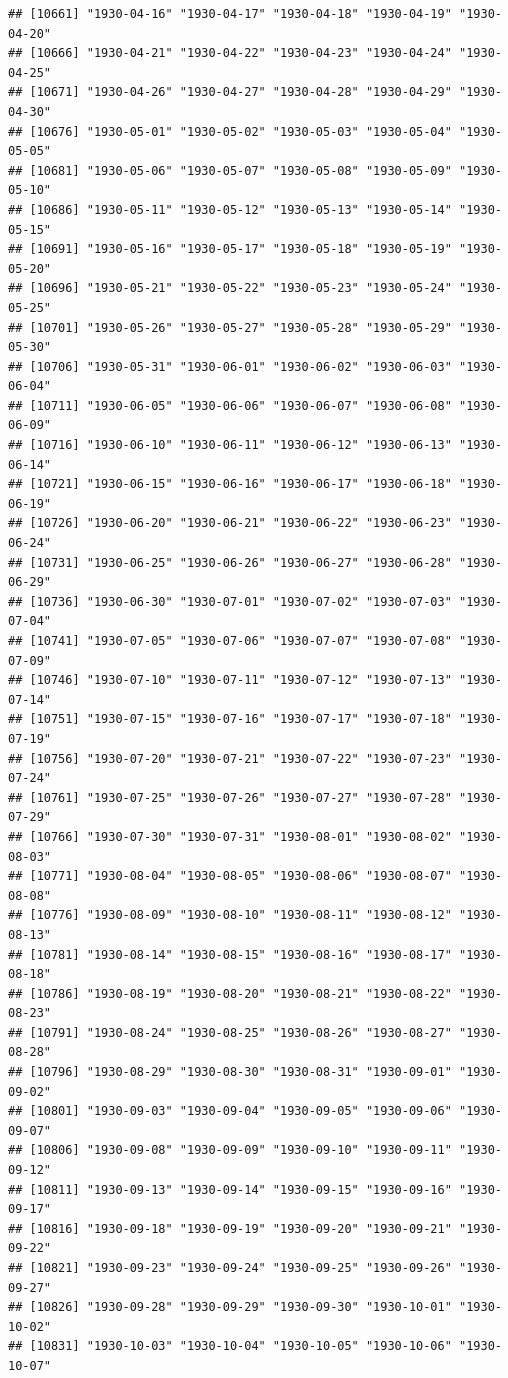 \documentclass{article}\usepackage[]{graphicx}\usepackage[]{color}
\makeatletter
\newenvironment{kframe}{%
 \def\at@end@of@kframe{}%
 \ifinner\ifhmode%
  \def\at@end@of@kframe{\end{minipage}}%
  \begin{minipage}{\columnwidth}%
 \fi\fi%
 \def\FrameCommand##1{\hskip\@totalleftmargin \hskip-\fboxsep
 \colorbox{shadecolor}{##1}\hskip-\fboxsep
     \hskip-\linewidth \hskip-\@totalleftmargin \hskip\columnwidth}%
 \MakeFramed {\advance\hsize-\width
   \@totalleftmargin\z@ \linewidth\hsize
   \@setminipage}}%
 {\par\unskip\endMakeFramed%
 \at@end@of@kframe}
\newenvironment{knitrout}{}{} %
\makeatother
\begin{document}
\begin{description}
\begin{knitrout}
\begin{kframe}
\begin{verbatim}
## [10661] "1930-04-16" "1930-04-17" "1930-04-18" "1930-04-19" "1930-04-20"
## [10666] "1930-04-21" "1930-04-22" "1930-04-23" "1930-04-24" "1930-04-25"
## [10671] "1930-04-26" "1930-04-27" "1930-04-28" "1930-04-29" "1930-04-30"
## [10676] "1930-05-01" "1930-05-02" "1930-05-03" "1930-05-04" "1930-05-05"
## [10681] "1930-05-06" "1930-05-07" "1930-05-08" "1930-05-09" "1930-05-10"
## [10686] "1930-05-11" "1930-05-12" "1930-05-13" "1930-05-14" "1930-05-15"
## [10691] "1930-05-16" "1930-05-17" "1930-05-18" "1930-05-19" "1930-05-20"
## [10696] "1930-05-21" "1930-05-22" "1930-05-23" "1930-05-24" "1930-05-25"
## [10701] "1930-05-26" "1930-05-27" "1930-05-28" "1930-05-29" "1930-05-30"
## [10706] "1930-05-31" "1930-06-01" "1930-06-02" "1930-06-03" "1930-06-04"
## [10711] "1930-06-05" "1930-06-06" "1930-06-07" "1930-06-08" "1930-06-09"
## [10716] "1930-06-10" "1930-06-11" "1930-06-12" "1930-06-13" "1930-06-14"
## [10721] "1930-06-15" "1930-06-16" "1930-06-17" "1930-06-18" "1930-06-19"
## [10726] "1930-06-20" "1930-06-21" "1930-06-22" "1930-06-23" "1930-06-24"
## [10731] "1930-06-25" "1930-06-26" "1930-06-27" "1930-06-28" "1930-06-29"
## [10736] "1930-06-30" "1930-07-01" "1930-07-02" "1930-07-03" "1930-07-04"
## [10741] "1930-07-05" "1930-07-06" "1930-07-07" "1930-07-08" "1930-07-09"
## [10746] "1930-07-10" "1930-07-11" "1930-07-12" "1930-07-13" "1930-07-14"
## [10751] "1930-07-15" "1930-07-16" "1930-07-17" "1930-07-18" "1930-07-19"
## [10756] "1930-07-20" "1930-07-21" "1930-07-22" "1930-07-23" "1930-07-24"
## [10761] "1930-07-25" "1930-07-26" "1930-07-27" "1930-07-28" "1930-07-29"
## [10766] "1930-07-30" "1930-07-31" "1930-08-01" "1930-08-02" "1930-08-03"
## [10771] "1930-08-04" "1930-08-05" "1930-08-06" "1930-08-07" "1930-08-08"
## [10776] "1930-08-09" "1930-08-10" "1930-08-11" "1930-08-12" "1930-08-13"
## [10781] "1930-08-14" "1930-08-15" "1930-08-16" "1930-08-17" "1930-08-18"
## [10786] "1930-08-19" "1930-08-20" "1930-08-21" "1930-08-22" "1930-08-23"
## [10791] "1930-08-24" "1930-08-25" "1930-08-26" "1930-08-27" "1930-08-28"
## [10796] "1930-08-29" "1930-08-30" "1930-08-31" "1930-09-01" "1930-09-02"
## [10801] "1930-09-03" "1930-09-04" "1930-09-05" "1930-09-06" "1930-09-07"
## [10806] "1930-09-08" "1930-09-09" "1930-09-10" "1930-09-11" "1930-09-12"
## [10811] "1930-09-13" "1930-09-14" "1930-09-15" "1930-09-16" "1930-09-17"
## [10816] "1930-09-18" "1930-09-19" "1930-09-20" "1930-09-21" "1930-09-22"
## [10821] "1930-09-23" "1930-09-24" "1930-09-25" "1930-09-26" "1930-09-27"
## [10826] "1930-09-28" "1930-09-29" "1930-09-30" "1930-10-01" "1930-10-02"
## [10831] "1930-10-03" "1930-10-04" "1930-10-05" "1930-10-06" "1930-10-07"

\end{verbatim}
\end{kframe}
\end{knitrout}
\end{description}
\end{document}
